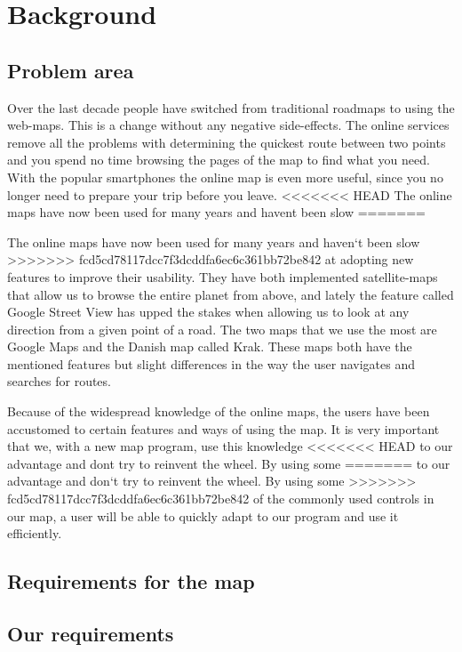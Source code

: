 \chapter{Background}
\label{BG}
\section{Problem area}
\label{BG-PR}
Over the last decade people have switched from traditional roadmaps 
to using the web-maps. This is a change without any negative side-effects. 
The online services remove all the problems with determining the quickest 
route between two points and you spend no time browsing the pages of 
the map to find what you need. With the popular smartphones the online 
map is even more useful, since you no longer need to prepare your trip 
before you leave.
<<<<<<< HEAD
The online maps have now been used for many years and havent been slow 
=======

The online maps have now been used for many years and haven`t been slow 
>>>>>>> fcd5cd78117dcc7f3dcddfa6ec6c361bb72be842
at adopting new features to improve their usability. They have both 
implemented satellite-maps that allow us to browse the entire planet 
from above, and lately the feature called Google Street View has upped 
the stakes when allowing us to look at any direction from a given point 
of a road. The two maps that we use the most are Google Maps and the 
Danish map called Krak. These maps both have the mentioned features 
but slight differences in the way the user navigates and searches 
for routes.

Because of the widespread knowledge of the online maps, the users 
have been accustomed to certain features and ways of using the map. 
It is very important that we, with a new map program, use this knowledge 
<<<<<<< HEAD
to our advantage and dont try to reinvent the wheel. By using some 
=======
to our advantage and don`t try to reinvent the wheel. By using some 
>>>>>>> fcd5cd78117dcc7f3dcddfa6ec6c361bb72be842
of the commonly used controls in our map, a user will be able to quickly 
adapt to our program and use it efficiently. 

\section{Requirements for the map}
\label{BG-R}
\section{Our requirements}
